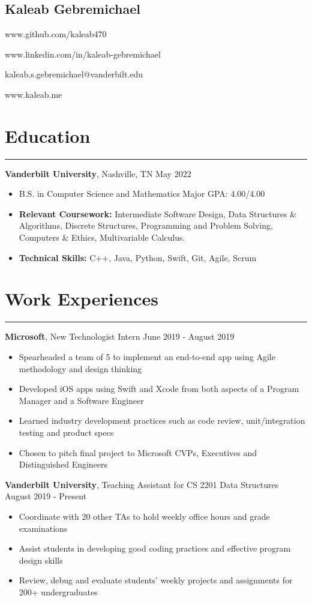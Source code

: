 \documentclass[11pt]{article}
\newcommand{\name}[1]{\begin{center}\section*{\huge #1}\end{center}}
\newcommand{\topinfo}[1]{\begin{center}\vspace{-0.3cm}#1\vspace{-0.2cm}\end{center}}
\newcommand{\resumesection}[1]{\vspace{-0.4cm}\section*{#1}\vspace{-0.2cm}\hrule\vspace{0.2cm}}
\begin{document}
\name{Kaleab Gebremichael}
\topinfo{www.github.com/kaleab470}
\topinfo{www.linkedin.com/in/kaleab-gebremichael}
\topinfo{kaleab.s.gebremichael@vanderbilt.edu}
\topinfo{www.kaleab.me}


\resumesection{Education}

\textbf{Vanderbilt University}, Nashville, TN \hfill May 2022
\begin{itemize}
	\item B.S. in Computer Science and Mathematics
	\hfill Major GPA: 4.00/4.00
	\item \textbf{Relevant Coursework: }Intermediate Software Design, Data Structures \& Algorithms, Discrete Structures, Programming and Problem Solving, Computers \& Ethics, Multivariable Calculus.
	\item \textbf{Technical Skills: }C++, Java, Python, Swift, Git, Agile, Scrum
\end{itemize}

\resumesection{Work Experiences}

\textbf{Microsoft}, New Technologist Intern \hfill June 2019 - August 2019
\begin{itemize}
	\item Spearheaded a team of 5 to implement an end-to-end app using Agile methodology and design thinking
	\item Developed iOS apps using Swift and Xcode from both aspects of a Program Manager and a Software Engineer
	\item Learned industry development practices such as code review, unit/integration testing and product specs
	\item Chosen to pitch final project to Microsoft CVPs, Executives and Distinguished Engineers
	\\[-0.7\baselineskip]
\end{itemize}

\textbf{Vanderbilt University}, Teaching Assistant for CS 2201 Data Structures
\hfill August 2019 - Present
\begin{itemize}
	\item Coordinate with 20 other TAs to hold weekly office hours and grade examinations
	\item Assist students in developing good coding practices and effective program design skills
	\item Review, debug and evaluate students' weekly projects and assignments for 200+ undergraduates
	\\[-0.7\baselineskip]
\end{itemize}
\end{document}
